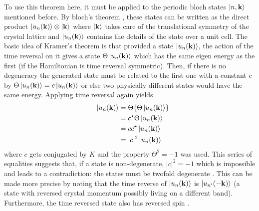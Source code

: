 To use this theorem here, it must be applied to the periodic bloch states $\ket{n, \mathbf{k}}$ mentioned before. By bloch's theorem \cite{girvin_modern_2019}, these states can be written as the direct product $\ket{u_n(\mathbf{k})}\otimes \ket{\mathbf{k}}$ where $\ket{\mathbf{k}}$ takes care of the translational symmetry of the crystal lattice and $\ket{u_n(\mathbf{k})}$ contains the details of the state over a unit cell. The basic idea of Kramer’s theorem is that provided a state $\ket{u_n(\mathbf{k})}$, the action of the time reversal on it gives a state $\Theta\ket{u_n(\mathbf{k})}$ which has the same eigen energy as the first (if the Hamiltonian is time reversal symmetric). Then, if there is no degeneracy the generated state must be related to the first one with a constant $c$ by $\Theta \ket{u_n(\mathbf{k})} = c \ket{u_n(\mathbf{k})}$ or else two physically different states would have the same energy\cite{kane_topological_2013}. Applying time reversal again yields
\begin{align*} 
    -\ket{u_n(\mathbf{k})} &= \Theta \{\Theta\ket{u_n(\mathbf{k})}\}\\ &= c^\star \Theta \ket{u_n(\mathbf{k})}\\ &= c c^\star \ket{u_n(\mathbf{k})}\\ &= |c|^2\ket{u_n(\mathbf{k})}
\end{align*}
where $c$ gets conjugated by $K$ and the property $\Theta^2 =-1$ was used. This series of equalities suggests that, if a state is non-degenerate, $|c|^2 = -1$ which is impossible and leads to a contradiction: the states must be twofold degenerate \cite{kane_topological_2013}. This can be made more precise by noting that the time reverse of $\ket{u_n(\mathbf{k})}$ is $\ket{u_{n'}(\mathbf{-k})}$ \cite{bernevig_topological_2013} (a state with reversed crystal momentum possibly living on a different band). Furthermore, the time reversed state also has reversed spin \cite{kruthoff_topology_2019}.\\

